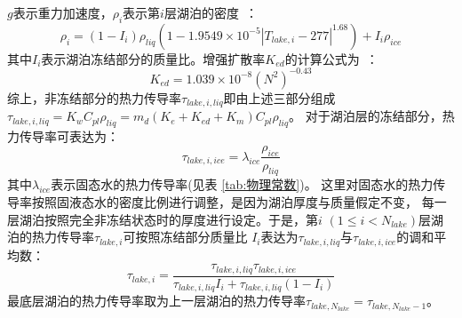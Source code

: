 $g$表示重力加速度，$\rho_i$表示第$i$层湖泊的密度~\citep{hostetler1990simulation}：
\begin{equation}\label{rho_i}
\rho_{i}=\left(1-I_{i}\right) \rho_{liq}\left(1-1.9549 \times 10^{-5}\left|T_{lake, i}-277\right|^{1.68}\right)+I_{i} \rho_{ice}
\end{equation}
其中$I_i$表示湖泊冻结部分的质量比。增强扩散率$K_{ed}$的计算公式为~\citep{fang1996long}：
\begin{equation}
K_{e d}=1.039 \times 10^{-8}\left(N^{2}\right)^{-0.43}
\end{equation}
综上，非冻结部分的热力传导率$\tau_{lake,i,liq}$即由上述三部分组成
$\tau_{lake,i,liq}=K_wC_{pl}\rho_{liq}=m_d\left(K_e+K_{ed}+K_m\right)C_{pl}\rho_{liq}$。
对于湖泊层的冻结部分，热力传导率可表达为：
\begin{equation}
\tau_{lake,i,ice}=\lambda_{ice} \frac{\rho_{ice}}{\rho_{liq}}
\end{equation}
其中$\lambda_{ice}$表示固态水的热力传导率(见表 \ref{tab:物理常数})。
这里对固态水的热力传导率按照固液态水的密度比例进行调整，是因为湖泊厚度与质量假定不变，
每一层湖泊按照完全非冻结状态时的厚度进行设定。于是，第$i$ $\left(1\le i<N_{lake}\right)$层湖泊的热力传导率$\tau_{lake,i}$可按照冻结部分质量比
$I_i$表达为$\tau_{lake,i,liq}$与$\tau_{lake,i,ice}$的调和平均数：
\begin{equation}
\tau_{lake, i}=\frac{\tau_{lake, i, liq} \tau_{lake, i, ice}}{\tau_{lake, i, liq} I_{i}+\tau_{lake, i, liq}\left(1-I_{i}\right)}
\end{equation}
最底层湖泊的热力传导率取为上一层湖泊的热力传导率$\tau_{lake,N_{lake}}=\tau_{lake,N_{lake}-1}$。 


